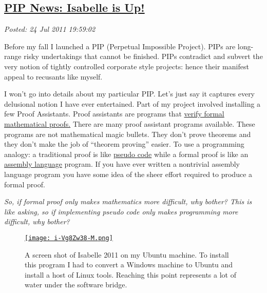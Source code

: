 %

\subsection*{\href{https://bakerjd99.wordpress.com/2011/07/24/pip-news-isabelle-is-up/}{PIP News: Isabelle is Up!}}


\noindent\emph{Posted: 24 Jul 2011 19:59:02}
\vspace{6pt}

Before my fall I launched a PIP (Perpetual Impossible Project). PIPs are
long-range risky undertakings that cannot be finished. PIPs
contradict and subvert the very notion of tightly controlled corporate
style projects: hence their manifest appeal to recusants like myself.

I won't go into details about my particular PIP. Let's just say it
captures every delusional notion I have ever entertained. Part of my
project involved installing a few Proof Assistants. Proof assistants are
programs that \href{http://www.cs.ru.nl/~freek/100/}{verify formal
mathematical proofs.} There are many proof assistant programs available.
These programs are not mathematical magic bullets. They don't prove
theorems and they don't make the job of ``theorem proving'' easier. To
use a programming analogy: a traditional proof is like
\href{http://en.wikipedia.org/wiki/Pseudocode}{pseudo code} while a
formal proof is like an
\href{http://en.wikipedia.org/wiki/Assembly\_language}{assembly
language} program. If you have ever written a nontrivial assembly
language program you have some idea of the sheer effort required to
produce a formal proof.

\emph{So, if formal proof only makes mathematics more difficult, why
bother? This is like asking, so if implementing pseudo code only makes
programming more difficult, why bother?}


\captionsetup[figure]{labelformat=empty}
\begin{SCfigure}[2][!h]
\centering
\href{http://www.cl.cam.ac.uk/research/hvg/Isabelle/index.html}{\texttt{[image: i-Vg8Zw38-M.png]}}
\caption[A  screen shot of Isabelle 2011 on my Ubuntu machine]{A  screen shot of Isabelle 2011 on my Ubuntu machine. To install this  
program I had to convert a Windows machine to Ubuntu and install a host  of Linux tools. 
Reaching this point represents a lot of water under the  software  bridge.}
\label{fig:1658X0}
\end{SCfigure}


